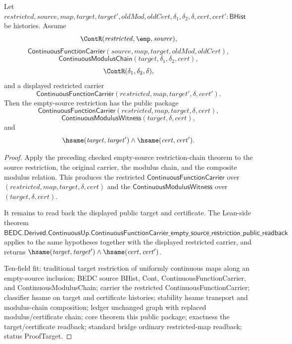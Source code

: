 
\begin{theorem}
\label{thm:continuous-empty-source-restriction-public-package}
Let $\mathit{restricted},\mathit{source},\mathit{map},\mathit{target},\mathit{target}',\mathit{oldMod},\mathit{oldCert},\delta_1,\delta_2,\delta,\mathit{cert},\mathit{cert}' : \mathsf{BHist}$ be histories. Assume
$$
\ContR(\mathit{restricted},\emp,\mathit{source}),
$$
$$
\mathsf{ContinuousFunctionCarrier}(\mathit{source},\mathit{map},\mathit{target},\mathit{oldMod},\mathit{oldCert}),
$$
$$
\mathsf{ContinuousModulusChain}(\mathit{target},\delta_1,\delta_2,\mathit{cert}),
$$
$$
\ContR(\delta_1,\delta_2,\delta),
$$
and a displayed restricted carrier
$$
\mathsf{ContinuousFunctionCarrier}(\mathit{restricted},\mathit{map},\mathit{target}',\delta,\mathit{cert}').
$$
Then the empty-source restriction has the public package
$$
\mathsf{ContinuousFunctionCarrier}(\mathit{restricted},\mathit{map},\mathit{target},\delta,\mathit{cert}),
$$
$$
\mathsf{ContinuousModulusWitness}(\mathit{target},\delta,\mathit{cert}),
$$
and
$$
\hsame(\mathit{target},\mathit{target}')\land\hsame(\mathit{cert},\mathit{cert}').
$$
\end{theorem}
\begin{proof}
Apply the preceding checked empty-source restriction-chain theorem to the source restriction, the original carrier, the modulus chain, and the composite modulus relation. This produces the restricted $\mathsf{ContinuousFunctionCarrier}$ over $(\mathit{restricted},\mathit{map},\mathit{target},\delta,\mathit{cert})$ and the $\mathsf{ContinuousModulusWitness}$ over $(\mathit{target},\delta,\mathit{cert})$.

It remains to read back the displayed public target and certificate. The Lean-side theorem $\mathsf{BEDC.Derived.ContinuousUp.ContinuousFunctionCarrier\_empty\_source\_restriction\_public\_readback}$ applies to the same hypotheses together with the displayed restricted carrier, and returns $\hsame(\mathit{target},\mathit{target}')\land\hsame(\mathit{cert},\mathit{cert}')$.

Ten-field fit: traditional target restriction of uniformly continuous maps along an empty-source inclusion; BEDC source BHist, Cont, ContinuousFunctionCarrier, and ContinuousModulusChain; carrier the restricted ContinuousFunctionCarrier; classifier hsame on target and certificate histories; stability hsame transport and modulus-chain composition; ledger unchanged graph with replaced modulus/certificate chain; core theorem this public package; exactness the target/certificate readback; standard bridge ordinary restricted-map readback; status ProofTarget.
\end{proof}

